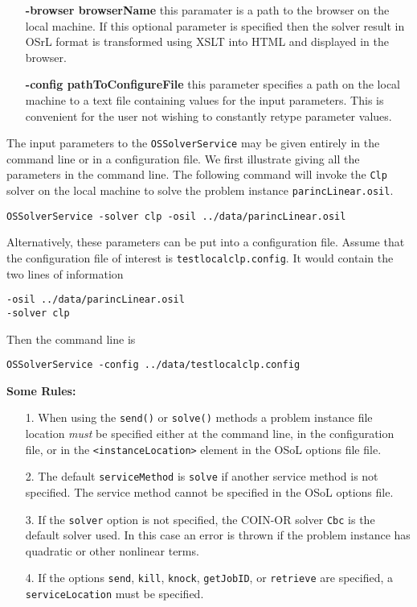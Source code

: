 \documentclass[11pt]{article}
\renewcommand{\_}{{\char"5F}}
\renewcommand{\{}{{\char"7B}}
\renewcommand{\}}{{\char"7D}}
\renewcommand{\^}{{\char"0D}}
\renewcommand{\'}{{\char"0D}}
\begin{document}
\begin{itemize}
\item[] {\bf -browser  browserName} this paramater is a path to the browser on the local machine. If this optional parameter is specified then the solver result in OSrL format is transformed using XSLT into HTML and displayed in the browser. 

\item[] {\bf -config pathToConfigureFile} this parameter specifies a path on the local machine to a text file containing values for the input parameters. This is convenient for the user not wishing to constantly retype parameter values.

\end{itemize}



The input parameters to the {\tt OSSolverService} may be given entirely in the command line or in a configuration file.  We first illustrate giving all the  parameters in the command line. The following command will invoke the {\tt Clp} solver on the local machine to solve the problem instance {\tt parincLinear.osil}.

\begin{verbatim}
OSSolverService -solver clp -osil ../data/parincLinear.osil 
\end{verbatim}

Alternatively, these parameters can be put into a configuration file. Assume that the configuration file of interest is {\tt testlocalclp.config}. It would contain the two lines of information
\begin{verbatim}
-osil ../data/parincLinear.osil
-solver clp
\end{verbatim}
Then the command line is
\begin{verbatim}
OSSolverService -config ../data/testlocalclp.config
\end{verbatim}


{\bf Some Rules:}

\begin{itemize}
\item[1.]  When using the {\tt send()} or  {\tt solve()} methods a problem instance file location {\it must} be specified either at  the command line, in the configuration file, or in the {\tt <instanceLocation>} element in the OSoL options file file.

\item[2.]  The default {\tt serviceMethod} is {\tt solve} if another service method is not specified.   The service method cannot be specified in the OSoL options file. 

\item [3.]  If the {\tt solver} option is not specified, the COIN-OR solver {\tt Cbc} is the default solver used. In this case an error is thrown if the problem instance has quadratic or other nonlinear terms. 

\item[4.]  If the options {\tt send}, {\tt kill}, {\tt knock},  {\tt getJobID},  or {\tt retrieve} are specified, a  {\tt serviceLocation} must be specified. 

\end{itemize}
\end{document}
